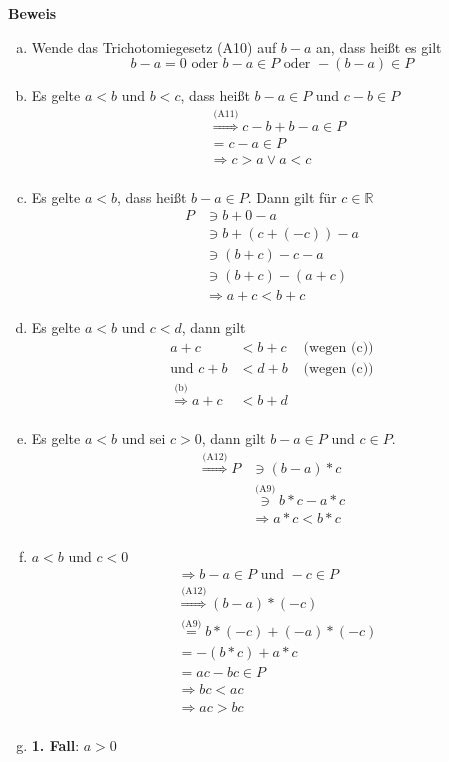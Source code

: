\documentclass{article}
\begin{document}
\textbf{Beweis}
\begin{enumerate}[(a)]
\item Wende das Trichotomiegesetz (A10) auf $b - a$ an, dass heißt es gilt
  \[
    b - a = 0 \text{ oder } b - a \in P \text{ oder } -(b - a) \in P
  \]
\item Es gelte $a < b$ und $b < c$, dass heißt $b - a \in P$ und $c - b \in P$
  \begin{align*}
    &\overset{\text{(A11)}}\Rightarrow c - b + b - a \in P \\
    &= c - a \in P \\
    &\Rightarrow c > a \lor a < c \\
  \end{align*}
\item Es gelte $a < b$, dass heißt $b - a \in P$. Dann gilt für $c \in \mathbb{R}$
  \begin{align*}
    P &\ni b + 0 - a \\
      &\ni b + (c + (-c)) - a \\
      &\ni (b + c) - c - a \\
      &\ni (b + c) - (a + c) \\
      &\Rightarrow a + c < b + c
  \end{align*}
\item Es gelte $a < b$ und $c < d$, dann gilt
  \begin{align*}
    a + c &< b + c &\text{ (wegen (c))} \\
    \text{und } c + b &< d + b &\text{ (wegen (c))} \\
    \overset{\text{(b)}}\Rightarrow a + c &< b + d \\ 
  \end{align*}
\item Es gelte $a < b$ und sei $c > 0$, dann gilt $b - a \in P$ und $c \in P$.
  \begin{align*}
    \overset{\text{(A12)}}\Rightarrow P &\ni (b -a) * c \\
                                        &\overset{\text{(A9)}}\ni b * c - a * c \\
                                        &\Rightarrow a * c < b * c \\
  \end{align*}
\item $a < b$ und $c < 0$
  \begin{align*}
    &\Rightarrow b - a \in P \text{ und } -c \in P \\
    &\overset{\text{(A12)}}\Rightarrow (b - a) * (-c) \\
    &\overset{\text{(A9)}}= b * (-c)  + (-a) * (-c) \\
    &= -(b * c)  + a * c \\
    &= ac - bc \in P \\
    &\Rightarrow bc < ac \\
    &\Rightarrow ac > bc \\
  \end{align*}
\item
  \begin{minipage}[t]{.4\textwidth}
    \textbf{1. Fall}: $a > 0$ \\


\end{minipage}
\end{enumerate}
\end{document}
